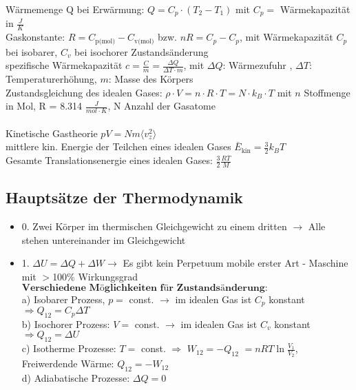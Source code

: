 \documentclass[fs, footer]{latex4ei}
\begin{document}
\begin{multicols*}{4}
Wärmemenge Q bei Erwärmung: $Q = C_p\cdot (T_2 - T_1)$ mit $C_p =$ Wärmekapazität in $\frac{J}{K}$\\
Gaskonstante: $R = C_{\text{p(mol)}} - C_{\text{v(mol)}}$ bzw. $n R = C_p - C_p$, mit Wärmekapazität $C_p$ bei isobarer, $C_v$ bei isochorer Zustandsänderung\\
spezifische Wärmekapazität $c = \frac{C}{m} = \frac{\Delta Q}{\Delta T\cdot m}$, mit $\Delta Q$: Wärmezufuhr , $\Delta T$: Temperaturerhöhung, $m$: Masse des Körpers\\

Zustandsgleichung des idealen Gases: $\rho\cdot V  = n \cdot R\cdot T = N\cdot k_B\cdot T$ mit $n$ Stoffmenge in Mol, R = 8.314 $\frac{J}{mol\cdot K}$, N Anzahl der Gasatome\\%
\\Kinetische Gastheorie $pV = Nm\langle v_z^2 \rangle$\\
mittlere kin. Energie der Teilchen eines idealen Gases $\bar{E}_{\text{kin}} = \frac{3}{2}k_B T$\\
Gesamte Translationsenergie eines idealen Gases: $\frac{3}{2}\frac{RT}{M}$\\

\subsection{Hauptsätze der Thermodynamik}
\begin{itemize}
\item 0. Zwei Körper im thermischen Gleichgewicht zu einem dritten $\rightarrow$ Alle stehen untereinander im Gleichgewicht\\
\item 1. $\Delta U = \Delta Q + \Delta W \rightarrow $ Es gibt kein Perpetuum mobile erster Art - Maschine mit $>$100\% Wirkungsgrad\\
$\textbf{Verschiedene Möglichkeiten für Zustandsänderung:}$\\
a) Isobarer Prozess, $p =$ const. $\rightarrow$ im idealen Gas ist $C_p$ konstant $\Rightarrow Q_{12} = C_p \Delta T$\\
b) Isochorer Prozess: $V =$ const. $\rightarrow$ im idealen Gas ist $C_v$ konstant $\Rightarrow Q_{12} = \Delta U$\\
c) Isotherme Prozesse: $T =$ const. $\Rightarrow$ $W_{12} = -Q_{12}$ %
$ =n RT \ln\frac{V_1}{V_2}$, Freiwerdende Wärme: $Q_{12} = -W_{12}$\\
d) Adiabatische Prozesse: $\Delta Q = 0$


\end{itemize}
\end{multicols*}
\end{document}

